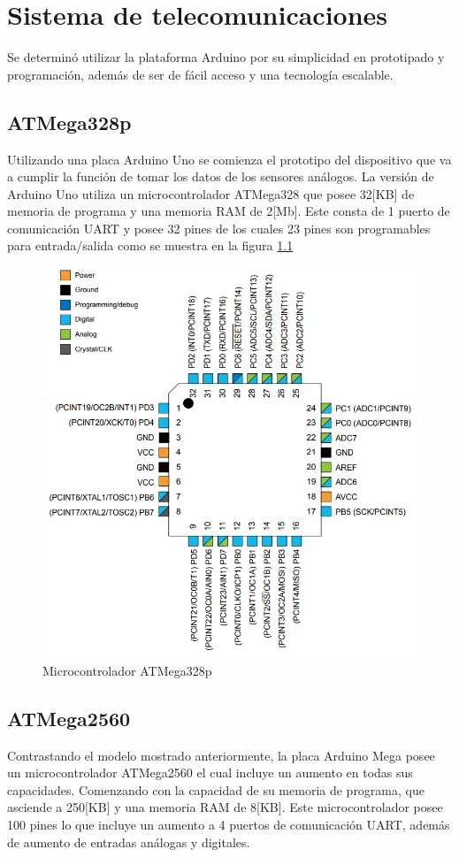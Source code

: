 \chapter{Sistema de telecomunicaciones}\label{comunicacion}
Se determinó utilizar la plataforma Arduino por su simplicidad en prototipado y programación, además de ser de fácil acceso y una tecnología escalable.
\section{ATMega328p}
Utilizando una placa Arduino Uno se comienza el prototipo del dispositivo que va a cumplir la función de tomar los datos de los sensores análogos. La versión de Arduino Uno utiliza un microcontrolador ATMega328 que posee 32[KB] de memoria de programa y una memoria RAM de 2[Mb]. Este consta de 1 puerto de comunicación UART y posee 32 pines de los cuales 23 pines son programables para entrada/salida como se muestra en la figura \ref{328}

\begin{figure}[H]
\centering
\includegraphics[scale=0.35]{figuras/mcu/328.png}
\caption{Microcontrolador ATMega328p}
\label{328}
\end{figure}

\section{ATMega2560}
Contrastando el modelo mostrado anteriormente, la placa Arduino Mega posee un microcontrolador ATMega2560 el cual incluye un aumento en todas sus capacidades. Comenzando con la capacidad de su memoria de programa, que asciende a 250[KB] y una memoria RAM de 8[KB]. Este microcontrolador posee 100 pines lo que incluye un aumento a 4 puertos de comunicación UART, además de aumento de entradas análogas y digitales. 

